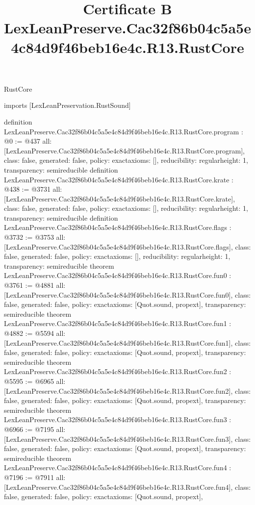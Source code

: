\begin{lexlean}{RustCore}
\title{Certificate B LexLeanPreserve.Cac32f86b04c5a5e4c84d9f46beb16e4c.R13.RustCore}
\begin{coremodule}
imports [LexLeanPreservation.RustSound]

definition LexLeanPreserve.Cac32f86b04c5a5e4c84d9f46beb16e4c.R13.RustCore.program : @0 := @437 {
  all: [LexLeanPreserve.Cac32f86b04c5a5e4c84d9f46beb16e4c.R13.RustCore.program],
  class: false,
  generated: false,
  policy: exact{axioms: []},
  reducibility: regular{height: 1},
  transparency: semireducible
}
definition LexLeanPreserve.Cac32f86b04c5a5e4c84d9f46beb16e4c.R13.RustCore.krate : @438 := @3731 {
  all: [LexLeanPreserve.Cac32f86b04c5a5e4c84d9f46beb16e4c.R13.RustCore.krate],
  class: false,
  generated: false,
  policy: exact{axioms: []},
  reducibility: regular{height: 1},
  transparency: semireducible
}
definition LexLeanPreserve.Cac32f86b04c5a5e4c84d9f46beb16e4c.R13.RustCore.flags : @3732 := @3753 {
  all: [LexLeanPreserve.Cac32f86b04c5a5e4c84d9f46beb16e4c.R13.RustCore.flags],
  class: false,
  generated: false,
  policy: exact{axioms: []},
  reducibility: regular{height: 1},
  transparency: semireducible
}
theorem LexLeanPreserve.Cac32f86b04c5a5e4c84d9f46beb16e4c.R13.RustCore.fun0 : @3761 := @4881 {
  all: [LexLeanPreserve.Cac32f86b04c5a5e4c84d9f46beb16e4c.R13.RustCore.fun0],
  class: false,
  generated: false,
  policy: exact{axioms: [Quot.sound, propext]},
  transparency: semireducible
}
theorem LexLeanPreserve.Cac32f86b04c5a5e4c84d9f46beb16e4c.R13.RustCore.fun1 : @4882 := @5594 {
  all: [LexLeanPreserve.Cac32f86b04c5a5e4c84d9f46beb16e4c.R13.RustCore.fun1],
  class: false,
  generated: false,
  policy: exact{axioms: [Quot.sound, propext]},
  transparency: semireducible
}
theorem LexLeanPreserve.Cac32f86b04c5a5e4c84d9f46beb16e4c.R13.RustCore.fun2 : @5595 := @6965 {
  all: [LexLeanPreserve.Cac32f86b04c5a5e4c84d9f46beb16e4c.R13.RustCore.fun2],
  class: false,
  generated: false,
  policy: exact{axioms: [Quot.sound, propext]},
  transparency: semireducible
}
theorem LexLeanPreserve.Cac32f86b04c5a5e4c84d9f46beb16e4c.R13.RustCore.fun3 : @6966 := @7195 {
  all: [LexLeanPreserve.Cac32f86b04c5a5e4c84d9f46beb16e4c.R13.RustCore.fun3],
  class: false,
  generated: false,
  policy: exact{axioms: [Quot.sound, propext]},
  transparency: semireducible
}
theorem LexLeanPreserve.Cac32f86b04c5a5e4c84d9f46beb16e4c.R13.RustCore.fun4 : @7196 := @7911 {
  all: [LexLeanPreserve.Cac32f86b04c5a5e4c84d9f46beb16e4c.R13.RustCore.fun4],
  class: false,
  generated: false,
  policy: exact{axioms: [Quot.sound, propext]},
}
\end{coremodule}
\end{lexlean}
